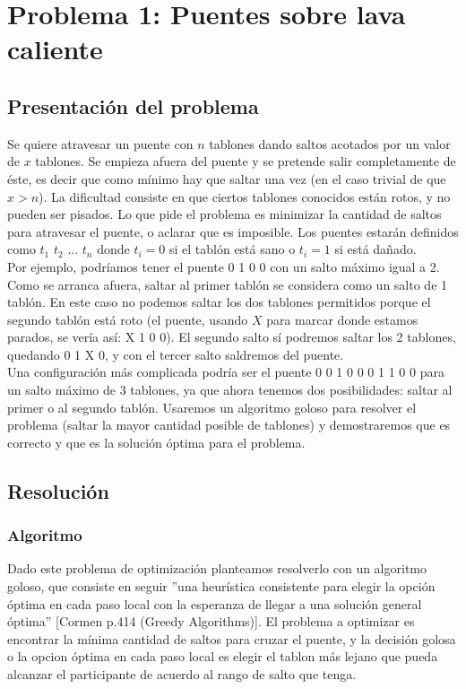 \section{Problema 1: Puentes sobre lava caliente}

\subsection{Presentaci\'on del problema}
Se quiere atravesar un puente con $n$ tablones dando saltos acotados por un valor de $x$ tablones. Se empieza afuera del puente y se pretende salir completamente de éste, es decir que como mínimo hay que saltar una vez (en el caso trivial de que $x > n$). La dificultad consiste en que ciertos tablones conocidos están rotos, y no pueden ser pisados. Lo que pide el problema es minimizar la cantidad de saltos para atravesar el puente, o aclarar que es imposible. Los puentes estarán definidos como $t_1$ $t_2$ $...$ $t_n$ donde $t_i = 0$ si el tablón está sano o $t_i = 1$ si está dañado. \\
Por ejemplo, podríamos tener el puente 0 1 0 0 con un salto máximo igual a 2. Como se arranca afuera, saltar al primer tablón se considera como un salto de 1 tablón. En este caso no podemos saltar los dos tablones permitidos porque el segundo tablón está roto (el puente, usando $X$ para marcar donde estamos parados, se vería así: X 1 0 0). El segundo salto sí podremos saltar los 2 tablones, quedando 0 1 X 0, y con el tercer salto saldremos del puente. \\
Una configuración más complicada podría ser el puente 0 0 1 0 0 0 1 1 0 0 para un salto máximo de 3 tablones, ya que ahora tenemos dos posibilidades: saltar al primer o al segundo tablón. Usaremos un algoritmo goloso para resolver el problema (saltar la mayor cantidad posible de tablones) y demostraremos que es correcto y que es la solución óptima para el problema.


\subsection{Resoluci\'on}
\subsubsection{Algoritmo}
Dado este problema de optimización planteamos resolverlo con un algoritmo goloso, que consiste en seguir ''una heurística consistente para elegir la opción óptima en cada paso local con la esperanza de llegar a una solución general óptima'' [Cormen p.414 (Greedy Algorithms)].
El problema a optimizar es encontrar la mínima cantidad de saltos para cruzar el puente, y la decisi\'on golosa o la opcion \'optima en cada paso local es elegir el tablon m\'as lejano que pueda alcanzar el participante de acuerdo al rango de salto que tenga. 

